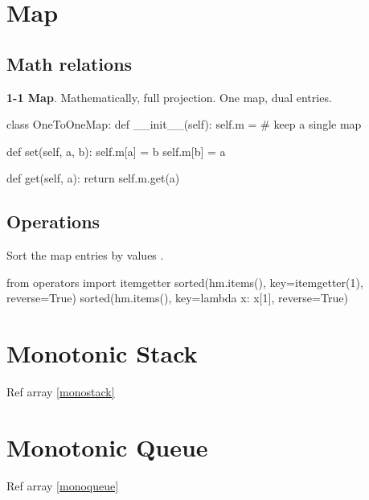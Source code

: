 \section{Map}
\subsection{Math relations}
\textbf{1-1 Map}. Mathematically, full projection. One map, dual entries.
\begin{python}
class OneToOneMap:
    def __init__(self):
        self.m = {}  # keep a single map

    def set(self, a, b):
        self.m[a] = b
        self.m[b] = a

    def get(self, a):
        return self.m.get(a)
\end{python}
\subsection{Operations}
 Sort the map entries by values .
\begin{python}
from operators import itemgetter 
sorted(hm.items(), key=itemgetter(1), reverse=True)
sorted(hm.items(), key=lambda x: x[1], reverse=True)
\end{python}
\section{Monotonic Stack}
Ref array \ref{monostack}
\section{Monotonic Queue}
Ref array \ref{monoqueue}
